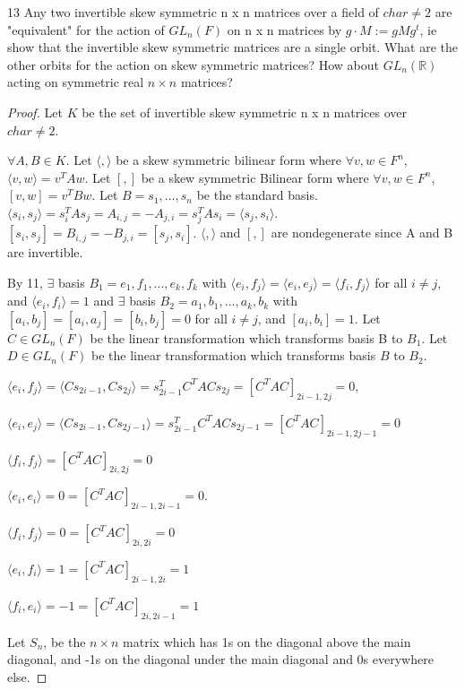 \documentclass{article}
\newcommand{\R}{\mathbb{R}}
\newcommand{\angles}[1]{\langle #1 \rangle}
\begin{document}
\begin{PROB}{13}\label{Problem 13.}
    Any two invertible skew symmetric n x n matrices over a field of $char \neq 2$ are "equivalent" for the action of $GL_n(F)$ on n x n matrices by  $g \cdot M := g M g^t$, ie show that the invertible skew symmetric matrices are a single orbit.  What are the other orbits for the action on skew symmetric matrices? How about $GL_n(\R)$ acting on symmetric real $n \times n$ matrices?
\end{PROB}
\begin{proof}
    Let $K$ be the set of invertible skew symmetric n x n matrices over $char \neq 2$. 

    $\forall A, B \in K$. Let $\angles{ , }$ be a skew symmetric bilinear form where $\forall v, w \in F^n$, $\angles{v, w} = v^T A w$. Let $[ , ]$ be a skew symmetric Bilinear form where $\forall v, w \in F^n$, $[v, w] = v^T B w$. Let $B = s_1, \dots, s_n$ be the standard basis. $\angles{s_i, s_j} = s_i^T A s_j = A_{i, j} = - A_{j, i} = s_j^T A s_i = \angles{s_j, s_i}$. $[s_i, s_j] = B_{i, j} = -B_{j, i} = [s_j, s_i]$. $\angles{ , }$ and $[ , ]$ are nondegenerate since A and B are invertible. 
    
    By 11, $\exists$ basis $B_1 = e_1,f_1, \dots, e_k,f_k$ with $\angles{e_i,f_j} = \angles{e_i, e_j} = \angles{f_i, f_j}$ for all $i \neq j$, and $\angles{e_i,f_i} =1$ and $\exists$ basis $B_2 = a_1,b_1, \dots, a_k,b_k$ with $[a_i,b_j] = [a_i, a_j] = [b_i, b_j] = 0$ for all $i \neq j$, and $[a_i, b_i] =1$. Let $C \in GL_n(F)$ be the linear transformation which transforms basis B to $B_1$. Let $D \in GL_n(F)$ be the linear transformation which transforms basis $B$ to $B_2$. 
    
    $\angles{e_i, f_j} = \angles{Cs_{2i - 1}, Cs_{2j}} = s_{2i - 1}^T C^T A C s_{2j} = [C^T A C]_{2i - 1, 2j} = 0$, 
    
    $\angles{e_i, e_j} = \angles{Cs_{2i - 1}, Cs_{2j - 1}} = s_{2i - 1}^T C^T A C s_{2j - 1} = [C^T A C]_{2i - 1, 2j - 1} = 0$
    
    $\angles{f_i, f_j} = [C^T A C]_{2i, 2j} = 0$

    $\angles{e_i, e_i} = 0 = [C^T A C]_{2i - 1, 2i - 1} = 0$.
    
    $\angles{f_i, f_j} = 0 = [C^T A C]_{2i, 2i} = 0$
    
    $\angles{e_i, f_i} = 1 = [C^T A C]_{2i - 1, 2i} = 1$
    
    $\angles{f_i, e_i} = -1 = [C^T A C]_{2i, 2i - 1} = 1$

    Let $S_n$, be the $n \times n$ matrix which has 1s on the diagonal above the main diagonal, and -1s on the diagonal under the main diagonal and 0s everywhere else.


\end{proof}
\end{document}
